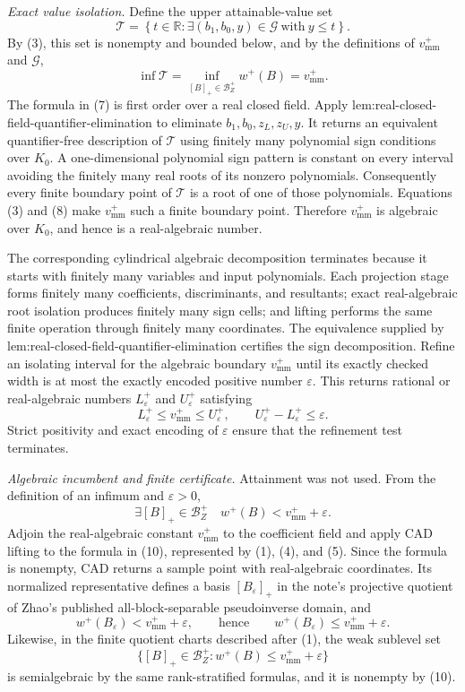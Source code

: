 \emph{Exact value isolation.}
Define the upper attainable-value set
\[
 \mathcal T
 =\left\{t\in\mathbb R:
   \exists (b_1,b_0,y)\in\mathcal G\ \text{with}\ y\le t
  \right\}.
\tag{7}
\]
By (3), this set is nonempty and bounded below, and by the definitions of \(v_{\mathrm{mm}}^+\) and \(\mathcal G\),
\[
 \inf\mathcal T
 =\inf_{[B]_+\in\mathcal B_Z^+}w^+(B)
 =v_{\mathrm{mm}}^+.
\tag{8}
\]
The formula in (7) is first order over a real closed field.  Apply lem:real-closed-field-quantifier-elimination to eliminate \(b_1,b_0,z_L,z_U,y\).  It returns an equivalent quantifier-free description of \(\mathcal T\) using finitely many polynomial sign conditions over \(K_0\).  A one-dimensional polynomial sign pattern is constant on every interval avoiding the finitely many real roots of its nonzero polynomials.  Consequently every finite boundary point of \(\mathcal T\) is a root of one of those polynomials.  Equations (3) and (8) make \(v_{\mathrm{mm}}^+\) such a finite boundary point.  Therefore \(v_{\mathrm{mm}}^+\) is algebraic over \(K_0\), and hence is a real-algebraic number.

The corresponding cylindrical algebraic decomposition terminates because it starts with finitely many variables and input polynomials.  Each projection stage forms finitely many coefficients, discriminants, and resultants; exact real-algebraic root isolation produces finitely many sign cells; and lifting performs the same finite operation through finitely many coordinates.  The equivalence supplied by lem:real-closed-field-quantifier-elimination certifies the sign decomposition.  Refine an isolating interval for the algebraic boundary \(v_{\mathrm{mm}}^+\) until its exactly checked width is at most the exactly encoded positive number \(\varepsilon\).  This returns rational or real-algebraic numbers \(L_\varepsilon^+\) and \(U_\varepsilon^+\) satisfying
\[
 L_\varepsilon^+\le v_{\mathrm{mm}}^+\le U_\varepsilon^+,
 \qquad
 U_\varepsilon^+-L_\varepsilon^+\le\varepsilon.
\tag{9}
\]
Strict positivity and exact encoding of \(\varepsilon\) ensure that the refinement test terminates.

\emph{Algebraic incumbent and finite certificate.}
Attainment was not used.  From the definition of an infimum and \(\varepsilon>0\),
\[
 \exists [B]_+\in\mathcal B_Z^+
 \quad w^+(B)<v_{\mathrm{mm}}^++\varepsilon.
\tag{10}
\]
Adjoin the real-algebraic constant \(v_{\mathrm{mm}}^+\) to the coefficient field and apply CAD lifting to the formula in (10), represented by (1), (4), and (5).  Since the formula is nonempty, CAD returns a sample point with real-algebraic coordinates.  Its normalized representative defines a basis \([B_\varepsilon]_+\) in the note's projective quotient of Zhao's published all-block-separable pseudoinverse domain, and
\[
 w^+(B_\varepsilon)<v_{\mathrm{mm}}^++\varepsilon,
 \qquad\text{hence}\qquad
 w^+(B_\varepsilon)\le v_{\mathrm{mm}}^++\varepsilon.
\tag{11}
\]
Likewise, in the finite quotient charts described after (1), the weak sublevel set
\[
 \{[B]_+\in\mathcal B_Z^+:w^+(B)\le v_{\mathrm{mm}}^++\varepsilon\}
\]
is semialgebraic by the same rank-stratified formulas, and it is nonempty by (10).

